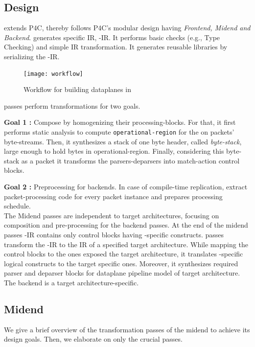 \documentclass[letterpaper,twocolumn,10pt]{article}
\begin{document}
\subsection{Design}
\ucomp extends P4C, thereby follows P4C's modular design having 
\emph{Frontend, Midend and Backend}. 
 generates \ucomp specific IR, \ucomp-IR. It 
performs basic checks (e.g., Type Checking) and simple IR 
transformation. It generates reusable libraries by serializing the 
\ucomp-IR.
\begin{figure}[tbh]
  \centering
  \texttt{[image: workflow]}
  \caption{Workflow for building dataplanes in \ulang}
  \label{fig:workflow}
\end{figure}
 passes perform transformations for two goals. \par
\textbf{Goal 1 :} Compose \uprograms by homogenizing their 
processing-blocks. For that, it first performs static analysis to 
compute \texttt{operational-region} for the \uprogram on packets' 
byte-streams. Then, it synthesizes a stack of one byte header, called 
\emph{byte-stack}, large enough to hold bytes in operational-region. 
Finally, considering this byte-stack as a packet it transforms the 
parsers-deparsers into match-action control blocks. \par
\textbf{Goal 2 :} Preprocessing for backends. In case of 
compile-time replication, extract packet-processing code for every 
packet instance and prepares processing schedule. \\
The Midend passes are independent to target 
architectures, focusing on composition and pre-processing for the
backend passes. At the end of the midend passes \ucomp-IR contains 
only control blocks having \uarch-specific constructs. 
 passes transform the \ucomp-IR to the IR of a 
specified target architecture. While mapping the control blocks to 
the ones exposed the target architecture, it translates 
\uarch-specific logical constructs to the target specific 
ones. Moreover, it synthesizes required parser and deparser blocks 
for dataplane pipeline model of target architecture. The backend is a 
target architecture-specific.



\subsection{\ucomp Midend}
We give a brief overview of the transformation passes of the midend 
to achieve its design goals. Then, we elaborate on only the crucial 
passes.
\end{document}
